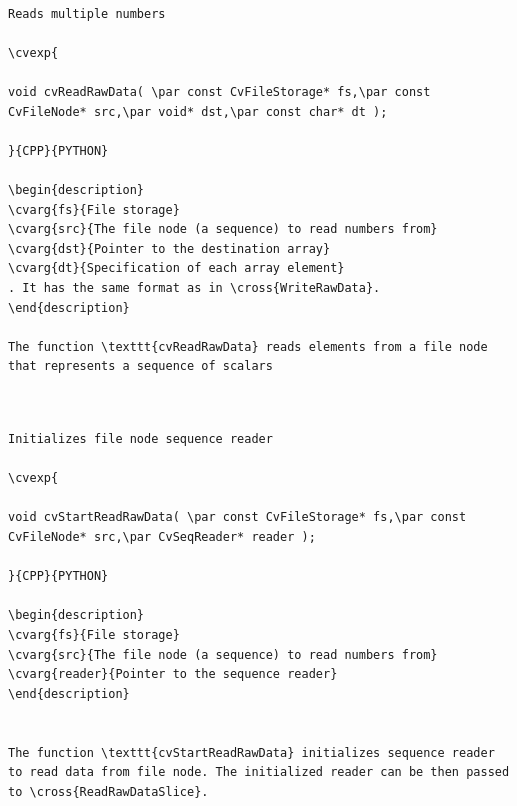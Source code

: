 \label{ReadRawData}
\begin{verbatim}

Reads multiple numbers

\cvexp{

void cvReadRawData( \par const CvFileStorage* fs,\par const CvFileNode* src,\par void* dst,\par const char* dt );

}{CPP}{PYTHON}

\begin{description}
\cvarg{fs}{File storage}
\cvarg{src}{The file node (a sequence) to read numbers from}
\cvarg{dst}{Pointer to the destination array}
\cvarg{dt}{Specification of each array element}
. It has the same format as in \cross{WriteRawData}.
\end{description}

The function \texttt{cvReadRawData} reads elements from a file node that represents a sequence of scalars


\end{verbatim}
\label{StartReadRawData}
\begin{verbatim}

Initializes file node sequence reader

\cvexp{

void cvStartReadRawData( \par const CvFileStorage* fs,\par const CvFileNode* src,\par CvSeqReader* reader );

}{CPP}{PYTHON}

\begin{description}
\cvarg{fs}{File storage}
\cvarg{src}{The file node (a sequence) to read numbers from}
\cvarg{reader}{Pointer to the sequence reader}
\end{description}


The function \texttt{cvStartReadRawData} initializes sequence reader to read data from file node. The initialized reader can be then passed to \cross{ReadRawDataSlice}.


\end{verbatim}
\label{ReadRawDataSlice}
